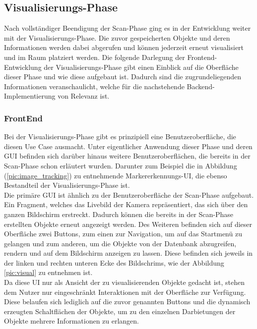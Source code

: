 \subsection{Visualisierungs-Phase} 
Nach vollständiger Beendigung der Scan-Phase ging es in der Entwicklung weiter mit der Visualisierungs-Phase. Die zuvor gespeicherten Objekte und 
deren Informationen werden dabei abgerufen und können jederzeit erneut visualisiert und im Raum platziert werden. Die folgende Darlegung der 
Frontend-Entwicklung der Visualisierungs-Phase gibt einen Einblick auf die Oberfläche dieser Phase und wie diese aufgebaut ist. Dadurch sind die 
zugrundeliegenden Informationen veranschaulicht, welche für die nachstehende Backend-Implementierung von Relevanz ist.   
\subsubsection{FrontEnd}
Bei der Visualisierungs-Phase gibt es prinzipiell eine Benutzeroberfläche, die diesen Use Case ausmacht. Unter eigentlicher Anwendung dieser Phase und 
deren \acs{GUI} befinden sich darüber hinaus weitere Benutzeroberflächen, die bereits in der Scan-Phase schon erläutert wurden. Darunter zum Beispiel 
die in Abbildung (\ref{pic:image_tracking}) zu entnehmende Markererkennungs-\acs{UI}, die ebenso Bestandteil der Visualisierungs-Phase ist. 
\\ 
Die primäre \acs{GUI} ist ähnlich zu der Benutzeroberfläche der Scan-Phase aufgebaut. Ein Fragment, welches das Livebild der Kamera repräsentiert, das 
sich über den ganzen Bildschirm erstreckt. Dadurch können die bereits in der Scan-Phase erstellten Objekte erneut angezeigt werden. Des Weiteren befinden 
sich auf dieser Oberfläche zwei Buttons, zum einen zur Navigation, um auf das Startmenü zu gelangen und zum anderen, um die Objekte von der Datenbank 
abzugreifen, rendern und auf dem Bildschirm anzeigen zu lassen. Diese befinden sich jeweils in der linken und rechten unteren Ecke des Bildschrims, wie 
der Abbildung \ref{pic:visual} zu entnehmen ist. 
\\ 
Da diese \acs{UI} nur als Ansicht der zu visualisierenden Objekte gedacht ist, stehen dem Nutzer nur eingeschränkt Interaktionen mit der Oberfläche zur 
Verfügung. Diese belaufen sich lediglich auf die zuvor genannten Buttons und die dynamisch erzeugten Schaltflächen der Objekte, um zu den einzelnen 
Darbietungen der Objekte mehrere Informationen zu erlangen. 
